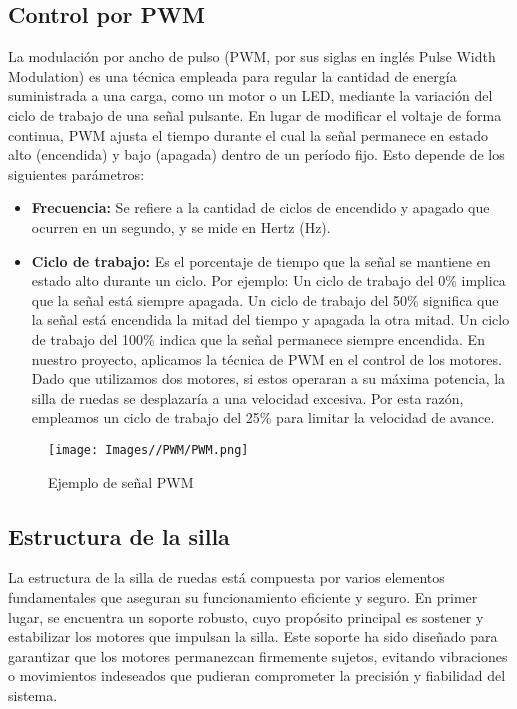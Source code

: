 \documentclass{article}
\begin{document}
\subsection{Control por PWM}
La modulación por ancho de pulso (PWM, por sus siglas en inglés Pulse Width Modulation) es una técnica empleada para regular la cantidad de energía suministrada a una carga, como un motor o un LED, mediante la variación del ciclo de trabajo de una señal pulsante. En lugar de modificar el voltaje de forma continua, PWM ajusta el tiempo durante el cual la señal permanece en estado alto (encendida) y bajo (apagada) dentro de un período fijo. Esto depende de los siguientes parámetros:

\begin{itemize}
    \item \textbf{Frecuencia:} Se refiere a la cantidad de ciclos de encendido y apagado que ocurren en un segundo, y se mide en Hertz (Hz).
    \item \textbf{Ciclo de trabajo:} Es el porcentaje de tiempo que la señal se mantiene en estado alto durante un ciclo. Por ejemplo:
    Un ciclo de trabajo del 0\% implica que la señal está siempre apagada.
    Un ciclo de trabajo del 50\% significa que la señal está encendida la mitad del tiempo y apagada la otra mitad.
    Un ciclo de trabajo del 100\% indica que la señal permanece siempre encendida.
    En nuestro proyecto, aplicamos la técnica de PWM en el control de los motores. Dado que utilizamos dos motores, si estos operaran a su máxima potencia, la silla de ruedas se desplazaría a una velocidad excesiva. Por esta razón, empleamos un ciclo de trabajo del 25\% para limitar la velocidad de avance.
\end{itemize}

\begin{figure}[H]
    \centering
    \texttt{[image: Images//PWM/PWM.png]}
    \caption{Ejemplo de señal PWM}
    \label{fig:enter-label}
\end{figure}

\subsection{Estructura de la silla}
La estructura de la silla de ruedas está compuesta por varios elementos fundamentales que aseguran su funcionamiento eficiente y seguro. En primer lugar, se encuentra un soporte robusto, cuyo propósito principal es sostener y estabilizar los motores que impulsan la silla. Este soporte ha sido diseñado para garantizar que los motores permanezcan firmemente sujetos, evitando vibraciones o movimientos indeseados que pudieran comprometer la precisión y fiabilidad del sistema.
\end{document}
